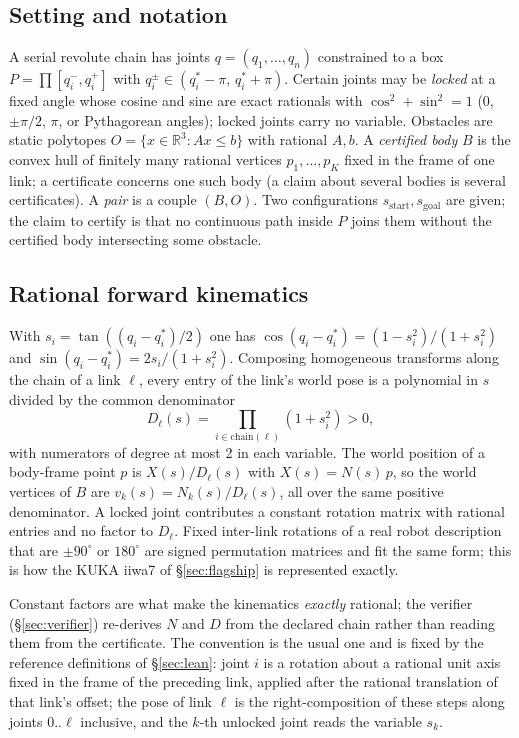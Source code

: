 \documentclass[10pt,twocolumn,letterpaper]{article}
\newcommand{\Rr}{\mathbb{R}}
\newif\ifhl \hlfalse  %
\newcommand{\new}[1]{\ifhl{\color{blue!65!black}#1}\else#1\fi}
\begin{document}
\subsection{Setting and notation}
A serial revolute chain has joints $q=(q_1,\dots,q_n)$ constrained to a box $P=\prod[q_i^-,q_i^+]$ with $q_i^\pm\in(q^*_i-\pi,\,q^*_i+\pi)$. Certain joints may be \emph{locked} at a fixed angle whose cosine and sine are exact rationals with $\cos^2+\sin^2=1$ (0, $\pm\pi/2$, $\pi$, or Pythagorean angles); locked joints carry no variable. Obstacles are static polytopes $O=\{x\in\Rr^3: Ax\le b\}$ with rational $A,b$. A \emph{certified body} $B$ is the convex hull of finitely many rational vertices $p_1,\dots,p_K$ fixed in the frame of one link\new{; a certificate concerns one such body (a claim about several bodies is several certificates)}. A \emph{pair} is a couple $(B,O)$. Two configurations $s_{\mathrm{start}},s_{\mathrm{goal}}$ are given; the claim to certify is that no continuous path inside $P$ joins them without \new{the certified body} intersecting some obstacle.

\subsection{Rational forward kinematics}
With $s_i=\tan((q_i-q^*_i)/2)$ one has $\cos(q_i-q^*_i)=(1-s_i^2)/(1+s_i^2)$ and $\sin(q_i-q^*_i)=2s_i/(1+s_i^2)$. Composing homogeneous transforms along the chain of a link $\ell$, every entry of the link's world pose is a polynomial in $s$ divided by the common denominator
\[
D_\ell(s)=\prod_{i\in\mathrm{chain}(\ell)}(1+s_i^2)>0,
\]
with numerators of degree at most 2 in each variable. The world position of a body-frame point $p$ is $X(s)/D_\ell(s)$ with $X(s)=N(s)\,p$, so the world vertices of $B$ are $v_k(s)=N_k(s)/D_\ell(s)$, all over the same positive denominator. A locked joint contributes a constant rotation matrix with rational entries and no factor to $D_\ell$. Fixed inter-link rotations of a real robot description that are $\pm90^\circ$ or $180^\circ$ are signed permutation matrices and fit the same form; this is how the KUKA iiwa7 of \S\ref{sec:flagship} is represented exactly.

Constant factors are what make the kinematics \emph{exactly} rational; the verifier (\S\ref{sec:verifier}) re-derives $N$ and $D$ from the declared chain rather than reading them from the certificate. \new{The convention is the usual one and is fixed by the reference definitions of \S\ref{sec:lean}: joint $i$ is a rotation about a rational unit axis fixed in the frame of the preceding link, applied after the rational translation of that link's offset; the pose of link $\ell$ is the right-composition of these steps along joints $0..\ell$ inclusive, and the $k$-th unlocked joint reads the variable $s_k$.}
\end{document}
